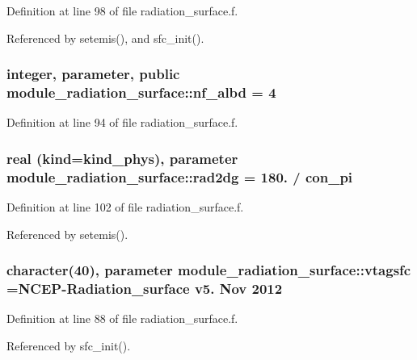 Definition at line 98 of file radiation\+\_\+surface.\+f.



Referenced by setemis(), and sfc\+\_\+init().

\subsubsection[{\texorpdfstring{nf\+\_\+albd}{nf_albd}}]{\setlength{\rightskip}{0pt plus 5cm}integer, parameter, public module\+\_\+radiation\+\_\+surface\+::nf\+\_\+albd = 4}\hypertarget{namespacemodule__radiation__surface_ab7800982c900bd632ca74d5e7d2b5ab3}{}\label{namespacemodule__radiation__surface_ab7800982c900bd632ca74d5e7d2b5ab3}


Definition at line 94 of file radiation\+\_\+surface.\+f.

\subsubsection[{\texorpdfstring{rad2dg}{rad2dg}}]{\setlength{\rightskip}{0pt plus 5cm}real (kind=kind\+\_\+phys), parameter module\+\_\+radiation\+\_\+surface\+::rad2dg = 180. / con\+\_\+pi\hspace{0.3cm}{\ttfamily [private]}}\hypertarget{namespacemodule__radiation__surface_ab879c7cf4e0774089a626e54226e4c1b}{}\label{namespacemodule__radiation__surface_ab879c7cf4e0774089a626e54226e4c1b}


Definition at line 102 of file radiation\+\_\+surface.\+f.



Referenced by setemis().

\subsubsection[{\texorpdfstring{vtagsfc}{vtagsfc}}]{\setlength{\rightskip}{0pt plus 5cm}character(40), parameter module\+\_\+radiation\+\_\+surface\+::vtagsfc =\textquotesingle{}N\+C\+EP-\/Radiation\+\_\+surface v5. Nov 2012 \textquotesingle{}\hspace{0.3cm}{\ttfamily [private]}}\hypertarget{namespacemodule__radiation__surface_ab0b8c10a0fb6be2644fdf91e3fe1fc5c}{}\label{namespacemodule__radiation__surface_ab0b8c10a0fb6be2644fdf91e3fe1fc5c}


Definition at line 88 of file radiation\+\_\+surface.\+f.



Referenced by sfc\+\_\+init().

